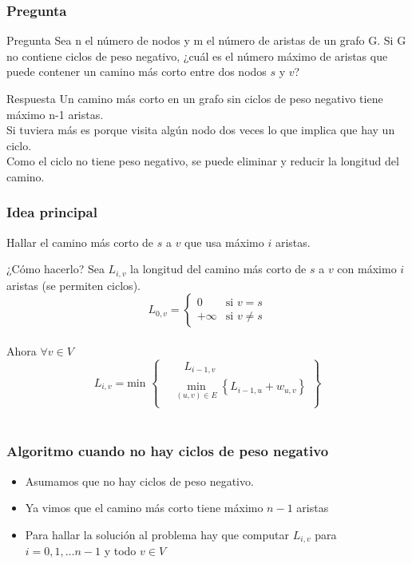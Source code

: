 \documentclass{beamer}
\begin{document}
	\begin{frame}
		\frametitle{Pregunta}
		\begin{alertblock}{Pregunta}
			Sea n el número de nodos y m el número de aristas de un grafo G. Si G no contiene ciclos de peso negativo, ¿cuál es el número máximo de aristas que puede contener un camino más corto entre dos nodos $s$ y $v$?
		\end{alertblock}
		\pause
		\begin{exampleblock}{Respuesta}
			Un camino más corto en un grafo sin ciclos de peso negativo tiene máximo n-1 aristas. \\
			Si tuviera más es porque visita algún nodo dos veces lo que implica que hay un ciclo. \\
			Como el ciclo no tiene peso negativo, se puede eliminar y reducir la longitud del camino.
		\end{exampleblock}
	\end{frame}
	
	\begin{frame}
		\frametitle{Idea principal}
		Hallar el camino más corto de $s$ a $v$ que usa máximo $i$ aristas.\\
		\begin{block}{¿Cómo hacerlo?}
			Sea $L_{i,v} $ la longitud del camino más corto de $s$ a $v$ con máximo $i$ aristas (se permiten ciclos).\\
			\[
				L_{0,v} =
				\begin{cases}
					0        &\text{si } v = s\\
					+\infty  &\text{si } v \neq s
				\end{cases}
			\]\\
			Ahora $\forall v \in V$\\
			\[ 
				L_{i,v} = \text{min } 
				\left\{
					\begin{aligned}
						& \quad L_{i-1,v}\\
						& \operatorname*{min}_{(u, v) \in E}  \left\{L_{i-1, u} + w_{u,v} \right\}\\
					\end{aligned}
				\right\}
			\]
			\quad \\
		\end{block}
	\end{frame}
	
	\begin{frame}
		\frametitle{Algoritmo cuando no hay ciclos de peso negativo}
		\begin{itemize}
			\item Asumamos que no hay ciclos de peso negativo.\\
			\item Ya vimos que el camino más corto tiene máximo $n-1$ aristas\\
			\item Para hallar la solución al problema hay que computar $L_{i, v}$ para $i = 0, 1, \ldots n-1$ y todo $v \in V$
		\end{itemize}
	\end{frame}
	
\end{document}
